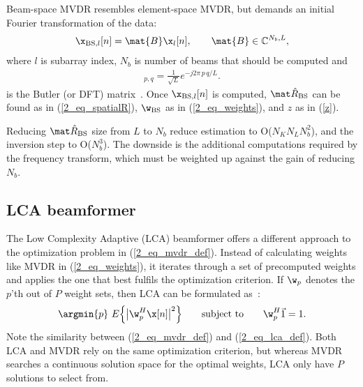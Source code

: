 {Beam-space MVDR resembles element-space MVDR, but demands an initial Fourier transformation of the data:
%
\begin{gather}
\x_{\text{BS},l}[n] = \mat{B}\x_l[n], \qquad \mat{B}\in \mathbb{C}^{N_b,L},\label{2_eq_beamspace}
\end{gather}
%
where $l$ is subarray index, $N_b$ is number of beams that should be computed and
%
\begin{gather}
[\mat{B}]_{p,q} = \frac{1}{\sqrt{L}} e^{-j2\pi\,p\,q/L}.\label{2_eq_butler}
\end{gather}
%
is the Butler (or DFT) matrix~\cite{Butler1961}. Once $\x_{\text{BS},l}[n]$ is computed, $\eR_\text{BS}$ can be found as in (\ref{2_eq_spatialR}), $\w_\text{BS}$ as in (\ref{2_eq_weights}), and $z$ as in (\ref{z}).

Reducing $\eR_\text{BS}$ size from $L$ to $N_b$ reduce estimation to O($N_K N_L N_b^2$), and the inversion step to O($N_b^3$). The downside is the additional computations required by the frequency transform, which must be weighted up against the gain of reducing $N_b$.



\subsection{LCA beamformer}

The Low Complexity Adaptive (LCA) beamformer offers a different approach to the optimization problem in (\ref{2_eq_mvdr_def}). Instead of calculating weights like MVDR in (\ref{2_eq_weights}), it iterates through a set of precomputed weights and applies the one that best fulfils the optimization criterion. If $\w_p$ denotes the $p$'th out of $P$ weight sets, then LCA can be formulated as~\cite{Synnevag2008}:
%
\begin{gather}
\argmin{p}\ E\Big\{\big|\w_p^H\x[n]\big|^2\Big\} \qquad\text{subject to}\qquad \w_p^H\1 = 1. \label{2_eq_lca_def}
\end{gather}
%
Note the similarity between (\ref{2_eq_mvdr_def}) and (\ref{2_eq_lca_def}). Both LCA and MVDR rely on the same optimization criterion, but whereas MVDR searches a continuous solution space for the optimal weights, LCA only have $P$ solutions to select from.





}
